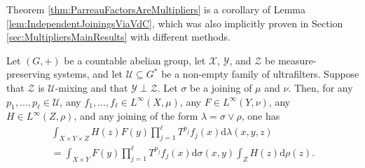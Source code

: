\documentclass[graybox]{svmult}
\theoremstyle{definition}
\begin{document}
Theorem \ref{thm:ParreauFactorsAreMultipliers} is a corollary of Lemma \ref{lem:IndependentJoiningsViaVdC}, which was also implicitly proven in Section \ref{sec:MultipliersMainResults} with different methods.

\begin{lemma}\label{lem:IndependentJoiningsViaVdC}
Let $(G,+)$ be a countable abelian group, let $\mathcal X$, $\mathcal Y$, and $\mathcal Z$ be measure-preserving systems, and let $\mathcal U\subseteq G^*$ be a non-empty family of  ultrafilters. Suppose that $\mathcal Z$ is $\mathcal U$-mixing and that $\mathcal Y\perp \mathcal Z$. Let $\sigma$ be a joining of $\mu$ and $\nu$.
Then, for any $p_1,...,p_\ell\in \mathcal U$,  any $f_1,...,f_\ell\in L^\infty(X,\mu)$, any $F\in L^\infty(Y,\nu)$,   any $H\in L^{\infty}(Z,\rho)$, and any joining of the form $\lambda=\sigma\lor \rho$, one has 
\begin{multline}\label{eq:IndependentJoiningVdC}
\int_{X\times Y\times Z}H(z)F(y)\prod_{j=1}^\ell T^{p_j}f_j(x)\text{d}\lambda(x,y,z)\\
=\int_{X\times Y} F(y) \prod_{j=1}^\ell T^{p_j}f_j(x)\text{d}\sigma(x,y)\int_Z H(z)\text{d}\rho(z).
\end{multline}
\end{lemma}
\end{document}
